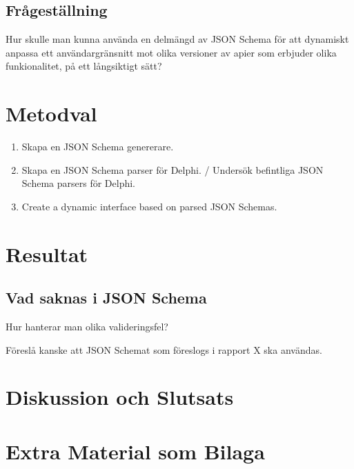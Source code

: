 \documentclass[swedish]{kththesis}
\begin{document}


\section{Frågeställning}

Hur skulle man kunna använda en delmängd av JSON Schema för att dynamiskt anpassa ett användargränsnitt mot olika versioner av apier som erbjuder olika funkionalitet, på ett långsiktigt sätt?


\chapter{Metodval}

\begin{enumerate}
	\item Skapa en JSON Schema genererare.
	\item Skapa en JSON Schema parser för Delphi. / Undersök befintliga JSON Schema parsers för Delphi.
	\item Create a dynamic interface based on parsed JSON Schemas.
\end{enumerate}

\chapter{Resultat}

\section{Vad saknas i JSON Schema}
Hur hanterar man olika valideringsfel?

Föreslå kanske att JSON Schemat som föreslogs i rapport X ska användas.

\chapter{Diskussion och Slutsats}

\printbibliography[heading=bibintoc] %

\appendix

\chapter{Extra Material som Bilaga}
\end{document}
